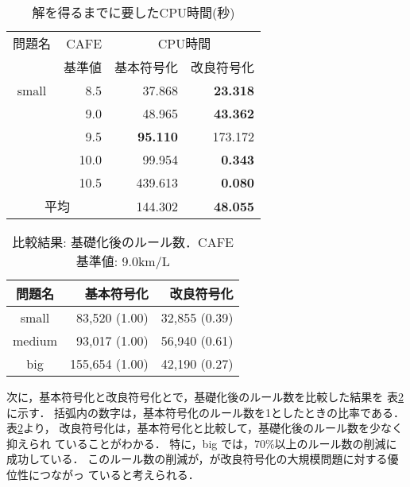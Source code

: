 \begin{table}[tbp]
 \caption{解を得るまでに要したCPU時間(秒)}
 \centering
 \begin{tabular}{c|r|rr}\bhline
  問題名 & CAFE  & \multicolumn{2}{c}{CPU時間} \\ \cline{3-4}   
        & 基準値 & 基本符号化  & 改良符号化 \\ \hline
  small & 8.5  & 37.868          & \textbf{23.318}   \\
  	& 9.0  & 48.965          & \textbf{43.362}   \\
  	& 9.5  & \textbf{95.110} & 173.172           \\
  	& 10.0 & 99.954          & \textbf{0.343}    \\
  	& 10.5 & 439.613         & \textbf{0.080}    \\ \hline \hline
  \multicolumn{2}{c}{平均}  & 144.302         & \textbf{48.055}   \\ \hline
 \end{tabular}
 \label{tab:cpu_time}
\end{table}
\begin{table}[tb]
 \caption{比較結果: 基礎化後のルール数．CAFE基準値: 9.0km/L}
 \centering
 \begin{tabular}{crr} \bhline
  問題名    & 基本符号化    & 改良符号化    \\ \hline
  small	    &  83,520 (1.00)  & 32,855 (0.39) \\ 
  medium    &  93,017 (1.00)  & 56,940 (0.61) \\
  big	    & 155,654 (1.00)  & 42,190 (0.27) \\ \hline
 \end{tabular}
 \label{tab:rule}
\end{table}

次に，基本符号化と改良符号化とで，基礎化後のルール数を比較した結果を
表\ref{tab:rule}に示す．
括弧内の数字は，基本符号化のルール数を1としたときの比率である．
表\ref{tab:rule}より，
改良符号化は，基本符号化と比較して，基礎化後のルール数を少なく抑えられ
ていることがわかる．
特に，big では，70\%以上のルール数の削減に成功している．
このルール数の削減が，が改良符号化の大規模問題に対する優位性につながっ
ていると考えられる．


